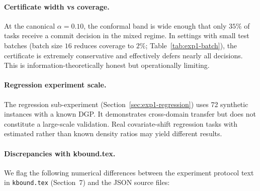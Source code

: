 \paragraph{Certificate width vs coverage.}
At the canonical $\alpha = 0.10$, the conformal band is wide enough that only $35\%$ of
tasks receive a commit decision in the mixed regime.  In settings with small test batches
(batch size $16$ reduces coverage to $2\%$; Table~\ref{tab:exp1-batch}), the certificate
is extremely conservative and effectively defers nearly all decisions.  This is
information-theoretically honest but operationally limiting.

\paragraph{Regression experiment scale.}
The regression sub-experiment (Section~\ref{sec:exp1-regression}) uses 72 synthetic
instances with a known DGP.  It demonstrates cross-domain transfer but does not constitute
a large-scale validation.  Real covariate-shift regression tasks with estimated rather than
known density ratios may yield different results.

\paragraph{Discrepancies with kbound.tex.}

We flag the following numerical differences between the experiment protocol text in
\texttt{kbound.tex} (Section~7) and the JSON source files:

